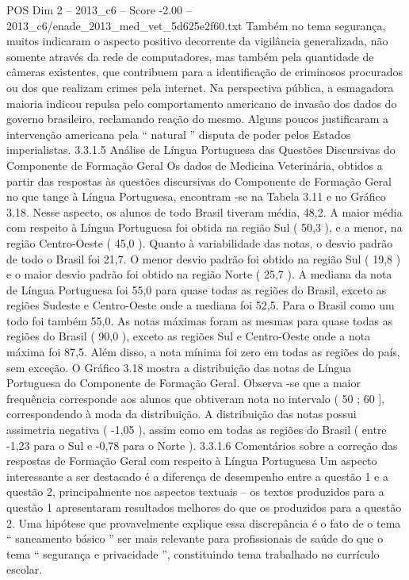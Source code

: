 \begin{textsample}{POS Dim 2 – 2013\_c6 – Score -2.00 – 2013\_c6/enade\_2013\_med\_vet\_5d625e2f60.txt}
Também no tema segurança, muitos indicaram o aspecto positivo decorrente da vigilância generalizada, não somente através da rede de computadores, mas também pela quantidade de câmeras existentes, que contribuem para a identificação de criminosos procurados ou dos que realizam crimes pela internet.
Na perspectiva pública, a esmagadora maioria indicou repulsa pelo comportamento americano de invasão dos dados do governo brasileiro, reclamando reação do mesmo.
Alguns poucos justificaram a intervenção americana pela “ natural ” disputa de poder pelos Estados imperialistas. 3.3.1.5 Análise de Língua Portuguesa das Questões Discursivas do Componente de Formação Geral Os dados de Medicina Veterinária, obtidos a partir das respostas às questões discursivas do Componente de Formação Geral no que tange à Língua Portuguesa, encontram -se na Tabela 3.11 e no Gráfico 3.18.
Nesse aspecto, os alunos de todo Brasil tiveram média, 48,2.
A maior média com respeito à Língua Portuguesa foi obtida na região Sul ( 50,3 ), e a menor, na região Centro-Oeste ( 45,0 ).
Quanto à variabilidade das notas, o desvio padrão de todo o Brasil foi 21,7.
O menor desvio padrão foi obtido na região Sul ( 19,8 ) e o maior desvio padrão foi obtido na região Norte ( 25,7 ).
A mediana da nota de Língua Portuguesa foi 55,0 para quase todas as regiões do Brasil, exceto as regiões Sudeste e Centro-Oeste onde a mediana foi 52,5.
Para o Brasil como um todo foi também 55,0.
As notas máximas foram as mesmas para quase todas as regiões do Brasil ( 90,0 ), exceto as regiões Sul e Centro-Oeste onde a nota máxima foi 87,5.
Além disso, a nota mínima foi zero em todas as regiões do país, sem exceção.
O Gráfico 3.18 mostra a distribuição das notas de Língua Portuguesa do Componente de Formação Geral.
Observa -se que a maior frequência corresponde aos alunos que obtiveram nota no intervalo ( 50 ; 60 ], correspondendo à moda da distribuição.
A distribuição das notas possui assimetria negativa ( -1,05 ), assim como em todas as regiões do Brasil ( entre -1,23 para o Sul e -0,78 para o Norte ). 3.3.1.6 Comentários sobre a correção das respostas de Formação Geral com respeito à Língua Portuguesa Um aspecto interessante a ser destacado é a diferença de desempenho entre a questão 1 e a questão 2, principalmente nos aspectos textuais – os textos produzidos para a questão 1 apresentaram resultados melhores do que os produzidos para a questão 2.
Uma hipótese que provavelmente explique essa discrepância é o fato de o tema “ saneamento básico ” ser mais relevante para profissionais de saúde do que o tema “ segurança e privacidade ”, constituindo tema trabalhado no currículo escolar.

\end{textsample}
